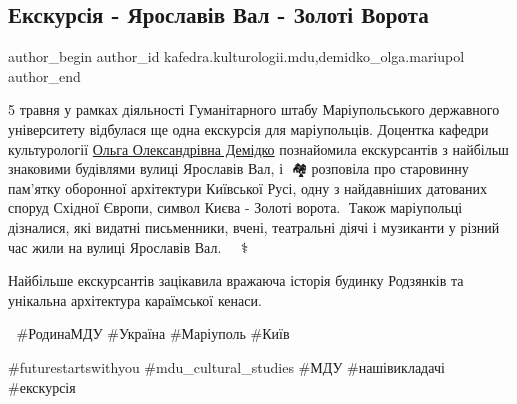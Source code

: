  
 
 
 
 

\subsection{Екскурсія - Ярославів Вал - Золоті Ворота}
\label{sec:05_05_2023.fb.kafedra.kulturologii.mdu.1.ekskursia_jaroslaviv_val_zoloti_vorota}
 
\ifcmt
 author_begin
   author_id kafedra.kulturologii.mdu,demidko_olga.mariupol
 author_end
\fi

5 травня у рамках діяльності Гуманітарного штабу Маріупольського державного
університету відбулася ще одна екскурсія для маріупольців. Доцентка кафедри
культурології \href{\urlDemidkoIA}{Ольга Олександрівна Демідко} познайомила екскурсантів з найбільш знаковими
будівлями вулиці Ярославів Вал, і 🏰🏘🏫розповіла про  старовинну пам'ятку
оборонної архітектури Київської Русі, одну з найдавніших датованих споруд
Східної Європи, символ Києва - Золоті ворота.🤎 Також маріупольці дізналися,
які видатні письменники, вчені, театральні діячі і музиканти у різний час жили
на вулиці Ярославів Вал.👨🔬👨🎨👩⚕️ 

Найбільше  екскурсантів зацікавила  вражаюча історія будинку Родзянків та
унікальна архітектура караїмської кенаси.

🏯  \#РодинаМДУ  \#Україна \#Маріуполь \#Київ

\#futurestartswithyou  \#mdu\_cultural\_studies \#МДУ  \#нашівикладачі \#екскурсія
